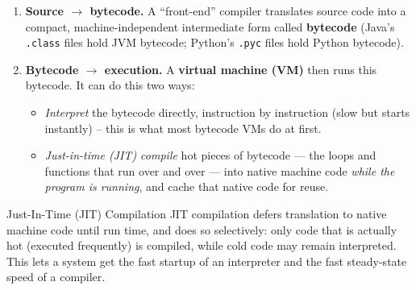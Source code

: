 \documentclass[full-course-notes.tex]{subfiles}
\begin{document}
\begin{enumerate}
  \item \textbf{Source $\to$ bytecode.} A ``front-end'' compiler translates source code into a
  compact, machine-independent intermediate form called \textbf{bytecode} (Java's \texttt{.class}
  files hold JVM bytecode; Python's \texttt{.pyc} files hold Python bytecode).
  \item \textbf{Bytecode $\to$ execution.} A \textbf{virtual machine (VM)} then runs this
  bytecode. It can do this two ways:
  \begin{itemize}
    \item \emph{Interpret} the bytecode directly, instruction by instruction (slow but starts
    instantly) -- this is what most bytecode VMs do at first.
    \item \emph{Just-in-time (JIT) compile} hot pieces of bytecode --- the loops and functions
    that run over and over --- into native machine code \emph{while the program is running}, and
    cache that native code for reuse.
  \end{itemize}
\end{enumerate}

\begin{defbox}{Just-In-Time (JIT) Compilation}
JIT compilation defers translation to native machine code until run time, and does so
selectively: only code that is actually hot (executed frequently) is compiled, while cold code
may remain interpreted. This lets a system get the fast startup of an interpreter and the fast
steady-state speed of a compiler.
\end{defbox}
\end{document}
